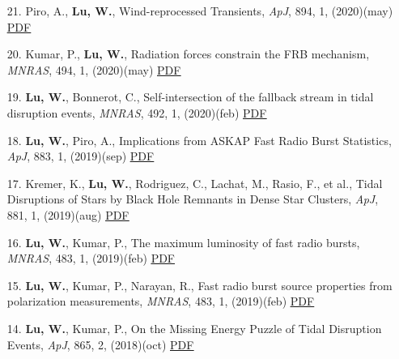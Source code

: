 \begin{itemize}[leftmargin=0.65cm]
\vspace{-0.1cm}
\item[21.]{Piro, A., {\bf Lu, W.}, {Wind-reprocessed Transients}, {\it ApJ}, 894, 1, (2020)(may) \href{https://ui.adsabs.harvard.edu/abs/2020ApJ...894....2P}{\underline{PDF}}}

\vspace{-0.1cm}
\item[20.]{Kumar, P., {\bf Lu, W.}, {Radiation forces constrain the FRB mechanism}, {\it MNRAS}, 494, 1, (2020)(may) \href{https://ui.adsabs.harvard.edu/abs/2020MNRAS.494.1217K}{\underline{PDF}}}

\vspace{-0.1cm}
\item[19.]{{\bf Lu, W.}, Bonnerot, C., {Self-intersection of the fallback stream in tidal disruption events}, {\it MNRAS}, 492, 1, (2020)(feb) \href{https://ui.adsabs.harvard.edu/abs/2020MNRAS.492..686L}{\underline{PDF}}}

\vspace{-0.1cm}
\item[18.]{{\bf Lu, W.}, Piro, A., {Implications from ASKAP Fast Radio Burst Statistics}, {\it ApJ}, 883, 1, (2019)(sep) \href{https://ui.adsabs.harvard.edu/abs/2019ApJ...883...40L}{\underline{PDF}}}

\vspace{-0.1cm}
\item[17.]{Kremer, K., {\bf Lu, W.}, Rodriguez, C., Lachat, M., Rasio, F., et al., {Tidal Disruptions of Stars by Black Hole Remnants in Dense Star Clusters}, {\it ApJ}, 881, 1, (2019)(aug) \href{https://ui.adsabs.harvard.edu/abs/2019ApJ...881...75K}{\underline{PDF}}}

\vspace{-0.1cm}
\item[16.]{{\bf Lu, W.}, Kumar, P., {The maximum luminosity of fast radio bursts}, {\it MNRAS}, 483, 1, (2019)(feb) \href{https://ui.adsabs.harvard.edu/abs/2019MNRAS.483L..93L}{\underline{PDF}}}

\vspace{-0.1cm}
\item[15.]{{\bf Lu, W.}, Kumar, P., Narayan, R., {Fast radio burst source properties from polarization measurements}, {\it MNRAS}, 483, 1, (2019)(feb) \href{https://ui.adsabs.harvard.edu/abs/2019MNRAS.483..359L}{\underline{PDF}}}

\vspace{-0.1cm}
\item[14.]{{\bf Lu, W.}, Kumar, P., {On the Missing Energy Puzzle of Tidal Disruption Events}, {\it ApJ}, 865, 2, (2018)(oct) \href{https://ui.adsabs.harvard.edu/abs/2018ApJ...865..128L}{\underline{PDF}}}


\end{itemize}
